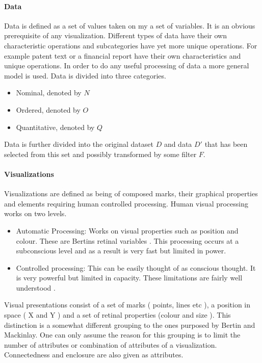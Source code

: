 \documentclass[a4paper, 11pt, titlepage, onehalfspacing]{report}
\begin{document}
\paragraph{Data}
Data is defined as a set of values taken on my a set of variables. It is an obvious prerequisite of any visualization. Different types of data have their own characteristic operations and subcategories have yet more unique operations. For example patent text or a financial report have their own characteristics and unique operations. In order to do any useful processing of data a more general model is used. Data is divided into three categories.
\begin{itemize}
\item Nominal, denoted by $N$
\item Ordered, denoted by $O$
\item Quantitative, denoted by $Q$
\end{itemize}
Data is further divided into the original dataset $D$ and data $D'$ that has been selected from this set and possibly transformed by some filter $F$.

\paragraph{Visualizations}
Visualizations are defined as being of composed marks, their graphical properties and elements requiring human controlled processing. Human visual processing works on two levels.
\begin{itemize}
\item Automatic Processing: Works on visual properties such as position and colour. These are Bertins retinal variables \cite{bertin1973semiologie}. This processing occurs at a subconscious level and as a result is very fast but limited in power.
\item Controlled processing: This can be easily thought of as conscious thought. It is very powerful but limited in capacity. These limitations are fairly well understood \cite{Mil56}.
\end{itemize}

Visual presentations consist of a set of marks ( points, lines etc ), a position in space ( X and Y ) and a set of retinal properties (colour and size ). This distinction is a somewhat different grouping to the ones purposed by Bertin and Mackinlay. One can only assume the reason for this grouping is to limit the number of attributes or combination of attributes of a visualization. Connectedness and enclosure are also given as attributes. 
\end{document}
